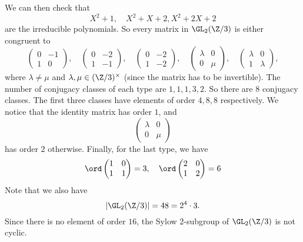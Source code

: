 \documentclass[a4paper]{article}
\begin{document}
\begin{eg}
  We can then check that
  \[
    X^2 + 1,\quad X^2 + X + 2, X^2 + 2X + 2
  \]
  are the irreducible polynomials. So every matrix in $\GL_2(\Z/3)$ is either congruent to
  \[
    \begin{pmatrix}
      0 & -1\\
      1 & 0
    \end{pmatrix},\quad
    \begin{pmatrix}
      0 & -2\\
      1 & -1
    \end{pmatrix},\quad
    \begin{pmatrix}
      0 & -2\\
      1 & -2
    \end{pmatrix},\quad
    \begin{pmatrix}
      \lambda & 0\\
      0 & \mu
    \end{pmatrix},\quad
    \begin{pmatrix}
      \lambda & 0\\
      1 & \lambda
    \end{pmatrix},
  \]
  where $\lambda \not= \mu$ and $\lambda, \mu \in (\Z/3)^\times$ (since the matrix has to be invertible). The number of conjugacy classes of each type are $1, 1, 1, 3, 2$. So there are 8 conjugacy classes. The first three classes have elements of order $4, 8, 8$ respectively. We notice that the identity matrix has order $1$, and
  \[
    \begin{pmatrix}
      \lambda & 0\\
      0 & \mu
    \end{pmatrix}
  \]
  has order $2$ otherwise. Finally, for the last type, we have
  \[
    \ord
    \begin{pmatrix}
      1 & 0\\
      1 & 1
    \end{pmatrix} = 3,\quad \ord
    \begin{pmatrix}
      2 & 0\\
      1 & 2
    \end{pmatrix} = 6
  \]
  Note that we also have
  \[
    |\GL_2(\Z/3)| = 48 = 2^4 \cdot 3.
  \]
  Since there is no element of order $16$, the Sylow $2$-subgroup of $\GL_2(\Z/3)$ is not cyclic.


\end{eg}
\end{document}
